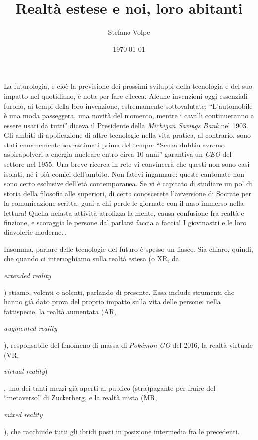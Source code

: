 \documentclass{article}
\title{Realtà estese e noi, loro abitanti}
\author{Stefano Volpe}
\date{\today}
\begin{document}
\maketitle
La futurologia, e cioè la previsione dei prossimi sviluppi della tecnologia e
del suo impatto nel quotidiano, è nota per fare cilecca. Alcune invenzioni oggi
essenziali furono, ai tempi della loro invenzione, estremamente sottovalutate:
``L'automobile è una moda passeggera, una novità del momento, mentre i cavalli
continueranno a essere usati da tutti'' diceva il Presidente della
\emph{Michigan Savings Bank} nel 1903. Gli ambiti di applicazione di altre
tecnologie nella vita pratica, al contrario, sono stati enormemente sovrastimati prima del tempo:
``Senza dubbio avremo aspirapolveri a energia nucleare entro circa 10 anni''
garantiva un \emph{CEO} del settore nel 1955. Una breve ricerca in rete vi
convincerà che questi non sono casi isolati, né i più comici dell'ambito. Non
fatevi ingannare: queste cantonate non sono certo esclusive dell'età
contemporanea. Se vi è capitato di studiare un po' di storia della filosofia
alle superiori, di certo conoscerete l'avversione di Socrate per la
comunicazione scritta: guai a chi perde le giornate con il naso immerso nella
lettura! Quella nefasta attività atrofizza la mente, causa confusione fra realtà
e finzione, e scoraggia le persone dal parlarsi faccia a faccia! I giovinastri e
le loro diavolerie moderne...

Insomma, parlare delle tecnologie del futuro è spesso un fiasco. Sia chiaro,
quindi, che quando ci interroghiamo sulla realtà estesa (o XR, da
\begin{otherlanguage}{american}\emph{extended reality}\end{otherlanguage})
stiamo, volenti o nolenti, parlando di presente. Essa include strumenti che
hanno già dato prova del proprio impatto sulla vita delle persone: nella
fattispecie, la realtà aumentata (AR,
\begin{otherlanguage}{american}\emph{augmented reality}\end{otherlanguage}),
responsabile del fenomeno di massa di \emph{Pokémon GO} del 2016, la realtà
virtuale (VR,
\begin{otherlanguage}{american}\emph{virtual reality})\end{otherlanguage}, uno
dei tanti mezzi già aperti al publico (stra)pagante per fruire del ``metaverso''
di Zuckerberg, e la realtà mista (MR, \begin{otherlanguage}{american}\emph{mixed
reality}\end{otherlanguage}), che racchiude tutti gli ibridi posti in posizione
intermedia fra le precedenti.
\end{document}
